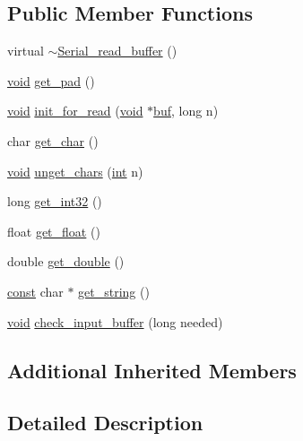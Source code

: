 \subsection*{Public Member Functions}
\begin{DoxyCompactItemize}
\item 
virtual \hyperlink{class_serial__read__buffer_ac33a4bbfe671a2a3aaa3c6ab23723ebf}{$\sim$\+Serial\+\_\+read\+\_\+buffer} ()
\item 
\hyperlink{sound_8c_ae35f5844602719cf66324f4de2a658b3}{void} \hyperlink{class_serial__read__buffer_abf3bfe78050a52c406b903417a0616a5}{get\+\_\+pad} ()
\item 
\hyperlink{sound_8c_ae35f5844602719cf66324f4de2a658b3}{void} \hyperlink{class_serial__read__buffer_a006cf2105a0cb63fe1c2f8cdba1711b6}{init\+\_\+for\+\_\+read} (\hyperlink{sound_8c_ae35f5844602719cf66324f4de2a658b3}{void} $\ast$\hyperlink{xlstr_8c_a781718f5b53a876fe91c424c4607fa8f}{buf}, long n)
\item 
char \hyperlink{class_serial__read__buffer_a48e6eeffcae860a5103b5cbccb6796eb}{get\+\_\+char} ()
\item 
\hyperlink{sound_8c_ae35f5844602719cf66324f4de2a658b3}{void} \hyperlink{class_serial__read__buffer_ad2aefc6dbda7bbd4bd3e7b8db45af2c7}{unget\+\_\+chars} (\hyperlink{xmltok_8h_a5a0d4a5641ce434f1d23533f2b2e6653}{int} n)
\item 
long \hyperlink{class_serial__read__buffer_a9cbdae0a27cdc8973605c374dc8f5be1}{get\+\_\+int32} ()
\item 
float \hyperlink{class_serial__read__buffer_af6b268f77befde5dbbe1aefedeb665a4}{get\+\_\+float} ()
\item 
double \hyperlink{class_serial__read__buffer_a5bdc704d96dbc7a7ef9003301e01a0b4}{get\+\_\+double} ()
\item 
\hyperlink{getopt1_8c_a2c212835823e3c54a8ab6d95c652660e}{const} char $\ast$ \hyperlink{class_serial__read__buffer_aef81232675eb624676b3f0a9adcfc46a}{get\+\_\+string} ()
\item 
\hyperlink{sound_8c_ae35f5844602719cf66324f4de2a658b3}{void} \hyperlink{class_serial__read__buffer_af33bbfe712eea854d02273df3f3cc313}{check\+\_\+input\+\_\+buffer} (long needed)
\end{DoxyCompactItemize}
\subsection*{Additional Inherited Members}


\subsection{Detailed Description}


